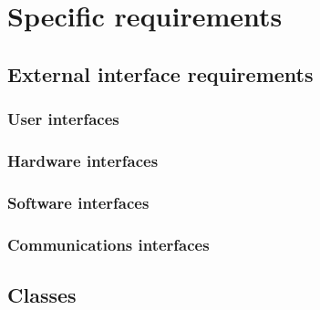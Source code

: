 \section{Specific requirements}
\vp


\subsection{External interface requirements}

\subsubsection{User interfaces}

\subsubsection{Hardware interfaces}

\subsubsection{Software interfaces}

\subsubsection{Communications interfaces}


\subsection{Classes}
\lstset{language=C++} %

\subsubsection{\code{\cs/}}

\begin{codes}

\end{codes}

\begin{codes}

\end{codes}

\subsubsection{}


